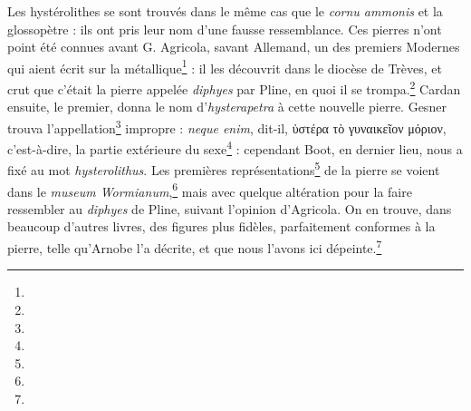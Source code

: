 \documentclass[a4paper, 11pt, oneside, polutonikogreek, french]{article}
\begin{document}
Les hystérolithes se sont trouvés dans le même cas que le \emph{cornu ammonis} et la glossopètre : ils ont pris leur nom d'une fausse ressemblance. Ces pierres n'ont point été connues avant G. Agricola, savant Allemand, un des premiers Modernes qui aient écrit sur la métallique\footnote{} : il les découvrit dans le diocèse de Trèves, et crut que c'était la pierre appelée \emph{diphyes} par Pline, en quoi il se trompa.\footnote{} Cardan ensuite, le premier, donna le nom d'\emph{hysterapetra} à cette nouvelle pierre. Gesner trouva l'appellation\footnote{} impropre : \emph{neque enim}, dit-il, ὑστέρα τὸ γυναικεῖον μόριον, c'est-à-dire, la partie extérieure du sexe\footnote{} : cependant Boot, en dernier lieu, nous a fixé au mot \emph{hysterolithus}. Les premières représentations\footnote{} de la pierre se voient dans le \emph{museum Wormianum},\footnote{} mais avec quelque altération pour la faire ressembler au \emph{diphyes} de Pline, suivant l'opinion d'Agricola. On en trouve, dans beaucoup d'autres livres, des figures plus fidèles, parfaitement conformes à la pierre, telle qu'Arnobe l'a décrite, et que nous l'avons ici dépeinte.\footnote{}
\end{document}
